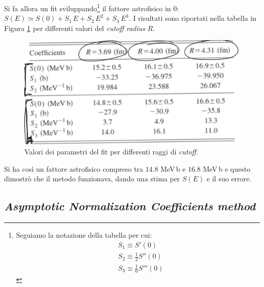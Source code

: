\noindent Si fa allora un fit sviluppando\footnote{Seguiamo la notazione della tabella per cui:%
\begin{align*}%
	&S_1 \equiv S'(0) \\
	&S_2 \equiv \frac{1}{2}S''(0) \\
	&S_3 \equiv \frac{1}{6}S'''(0) 
\end{align*}%
} il fattore astrofisico in 0: $S(E) \simeq S(0) + S_1 \, E + S_2 \, E^2 + S_3 \, E^3$. I risultati sono riportati nella tabella in Figura \ref{0421_tab} per differenti valori del \textit{cutoff radius} $R$.

\begin{figure}[h]
	\centering
	\includegraphics[scale=0.5]{Immagini/0421_tab.png}
	\caption{Valori dei parametri del fit per differenti raggi di \textit{cutoff}.}
	\label{0421_tab}
\end{figure}

\noindent Si ha così un fattore astrofisico compreso tra $14.8$ MeV$\,$b e $16.8$ MeV$\,$b e questo dimostrò che il metodo funzionava, dando una stima per $S(E)$ e il suo errore.

\subsection{\textit{Asymptotic Normalization Coefficients method}}
